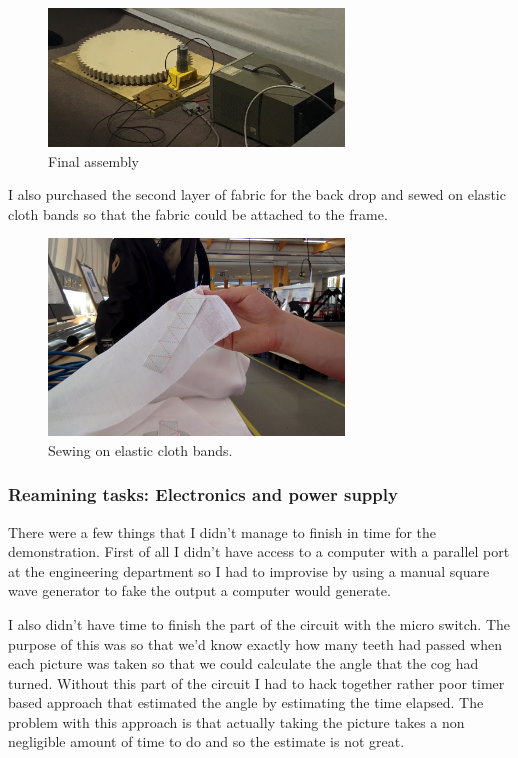\documentclass[a4paper]{article}
\begin{document}
\begin{figure}[H]
  \centering
    \includegraphics[width=0.7\textwidth]{figures/assembly.jpg}
    \caption{Final assembly}
  \label{fig:f2}
\end{figure}

I also purchased the second layer of fabric for the back drop and sewed on elastic cloth bands so that the fabric could be attached to the frame.

\begin{figure}[H]
  \centering
    \includegraphics[width=0.7\textwidth]{figures/sewing.jpg}
    \caption{Sewing on elastic cloth bands.}
  \label{fig:f2}
\end{figure}

\subsubsection{Reamining tasks: Electronics and power supply}
There were a few things that I didn't manage to finish in time for the demonstration.
First of all I didn't have access to a computer with a parallel port at the engineering department so I had to improvise by using a manual square wave generator to fake the output a computer would generate.

I also didn't have time to finish the part of the circuit with the micro switch.
The purpose of this was so that we'd know exactly how many teeth had passed when each picture was taken so that we could calculate the angle that the cog had turned.
Without this part of the circuit I had to hack together rather poor timer based approach that estimated the angle by estimating the time elapsed.
The problem with this approach is that actually taking the picture takes a non negligible amount of time to do and so the estimate is not great.
\end{document}
